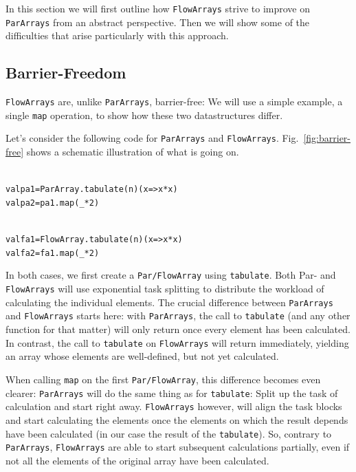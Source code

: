 \documentclass[runningheads,a4paper,fleqn]{llncs}
\begin{document}
In this section we will first outline how \texttt{FlowArrays} strive to improve
on \texttt{ParArrays} from an abstract perspective. Then we will show some of
the difficulties that arise particularly with this approach.

\subsection{Barrier-Freedom}
\texttt{FlowArrays} are, unlike \texttt{ParArrays}, barrier-free: We will use a simple
example, a single \texttt{map} operation, to show how these two
datastructures differ.

Let's consider the following code for \texttt{ParArrays} and
\texttt{FlowArrays}. Fig.~\ref{fig:barrier-free} shows a schematic
illustration of what is going on.

\noindent
\begin{minipage}[t]{.5\textwidth}
\begin{alltt}
{\scriptsize
val pa1 = ParArray.tabulate(n)(x => x*x)
val pa2 = pa1.map(_ * 2)
}
\end{alltt}
\end{minipage}
\begin{minipage}[t]{.5\textwidth}
\begin{alltt}
{\scriptsize
val fa1 = FlowArray.tabulate(n)(x => x*x)
val fa2 = fa1.map(_ * 2)
}
\end{alltt}
\end{minipage}

In both cases, we first create a \texttt{Par/FlowArray} using
\texttt{tabulate}. Both Par- and \texttt{FlowArrays} will use exponential task
splitting \cite{collect11,cong08} to distribute the workload of
calculating the individual elements. The crucial difference between
\texttt{ParArrays} and \texttt{FlowArrays} starts here: with \texttt{ParArrays}, the call to
\texttt{tabulate} (and any other function for that matter) will only
return once every element has been calculated. In contrast, the call
to \texttt{tabulate} on \texttt{FlowArrays} will return immediately, yielding
an array whose elements are well-defined, but not yet calculated.

When calling \texttt{map} on the first \texttt{Par/FlowArray}, this difference
becomes even clearer: \texttt{ParArrays} will do the same thing as for
\texttt{tabulate}: Split up the task of calculation and start right
away. \texttt{FlowArrays} however, will align the task blocks and start
calculating the elements once the elements on which the result depends have
been calculated (in our case the result of the \texttt{tabulate}). So,
contrary to \texttt{ParArrays}, \texttt{FlowArrays} are able to start subsequent
calculations partially, even if not all the elements of the original
array have been calculated.
\end{document}
